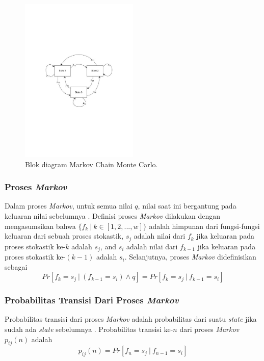 {{{{{{\begin{figure}[!h]
	\centering
	\includegraphics[width=0.5\textwidth]{Fig/diagramMCMC}
	\caption{Blok diagram Markov Chain Monte Carlo.}
	\label{diagramMCMC}
\end{figure}

\subsubsection{Proses \textit{Markov}}
Dalam proses \textit{Markov}, untuk semua nilai $q$, nilai saat ini bergantung pada keluaran nilai sebelumnya \cite{Revuz1984}. Definisi proses \textit{Markov} dilakukan dengan mengasumsikan bahwa $\{f_k\ |\ k \in [1,2,...,w]\}$ adalah himpunan dari fungsi-fungsi keluaran dari sebuah proses stokastik, $s_j$ adalah nilai dari $f_k$ jika keluaran pada proses stokastik ke-$k$ adalah $s_j$, and $s_i$ adalah nilai dari $f_{k-1}$ jika keluaran pada proses stokastik ke-$(k-1)$ adalah $s_i$. Selanjutnya, proses \textit{Markov} didefinisikan sebagai 
\begin{equation}
Pr[f_k=s_j\ |\ (f_{k-1}=s_i)\wedge q]=Pr[f_k=s_j\ |\ f_{k-1}=s_i]\label{fmc}
\end{equation}
\subsubsection{Probabilitas Transisi Dari Proses \textit{Markov}}
Probabilitas transisi dari proses \textit{Markov} adalah probabilitas dari suatu \textit{state} jika sudah ada \textit{state} sebelumnya \cite{Revuz1984}. Probabilitas transisi ke-$n$ dari proses \textit{Markov} $p_{ij}(n)$ adalah
\begin{equation}
p_{ij}(n)=Pr[f_n=s_j\ |\ f_{n-1}=s_i]\label{tp1}
\end{equation}
}}}}}}
